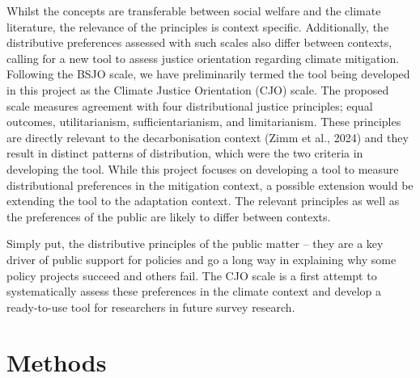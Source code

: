 \documentclass[10pt,letterpaper]{article}
\begin{document}
Whilst the concepts are transferable between social welfare and the climate literature, the relevance of the principles is context specific. Additionally, the distributive preferences assessed with such scales also differ between contexts, calling for a new tool to assess justice orientation regarding climate mitigation. Following the BSJO scale, we have preliminarily termed the tool being developed in this project as the Climate Justice Orientation (CJO) scale. The proposed scale measures agreement with four distributional justice principles; equal outcomes, utilitarianism, sufficientarianism, and limitarianism. These principles are directly relevant to the decarbonisation context (Zimm et al., 2024) and they result in distinct patterns of distribution, which were the two criteria in developing the tool. While this project focuses on developing a tool to measure distributional preferences in the mitigation context, a possible extension would be extending the tool to the adaptation context. The relevant principles as well as the preferences of the public are likely to differ between contexts.  


Simply put, the distributive principles of the public matter – they are a key driver of public support for policies and go a long way in explaining why some policy projects succeed and others fail. The CJO scale is a first attempt to systematically assess these preferences in the climate context and develop a ready-to-use tool for researchers in future survey research. %

\section*{Methods}

\end{document}
